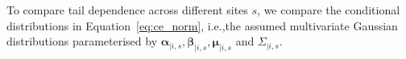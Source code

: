 \documentclass[12pt]{article}
\DeclareMathOperator{\CE}{\mathrm{CE}}
\begin{document}
To compare tail dependence across different sites $s$, we compare the conditional distributions in Equation~\eqref{eq:ce_norm}, i.e.,\@ the assumed multivariate Gaussian distributions parameterised by $\symbf{\alpha}_{\mid i, s},\symbf{\beta}_{\mid i, s},\symbf{\mu}_{\mid i, s}$ and $\Sigma_{\mid i, s}$. %
\end{document}
